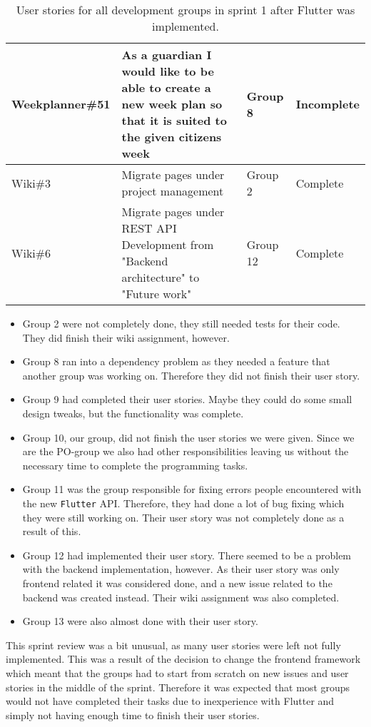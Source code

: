 \begin{table}[H]
\begin{tabular}{|p{2.8cm}|p{7cm}|p{1.6cm}|p{2cm}|}
    Weekplanner\#51 & As a guardian I would like to be able to create a new week plan so that it is suited to the given citizens week                                                          & Group 8         & Incomplete    \\ \hline
    Wiki\#3         & Migrate pages under project management                                                                                                                                   & Group 2         & Complete    \\ \hline
    Wiki\#6         & Migrate pages under REST API Development from "Backend architecture" to "Future work"                                                                                    & Group 12        & Complete    \\ \hline
    \end{tabular}
   \caption{User stories for all development groups in sprint 1 after Flutter was implemented.}\label{table:user-stories-sprint-1-review}
\end{table}

\begin{itemize}
    \item Group 2 were not completely done, they still needed tests for their code. They did finish their wiki assignment, however.
    \item Group 8 ran into a dependency problem as they needed a feature that another group was working on. Therefore they did not finish their user story.
    \item Group 9 had completed their user stories. Maybe they could do some small design tweaks, but the functionality was complete.
    \item Group 10, our group, did not finish the user stories we were given. Since we are the PO-group we also had other responsibilities leaving us without the necessary time to complete the programming tasks.
    \item Group 11 was the group responsible for fixing errors people encountered with the new \texttt{Flutter} API. Therefore, they had done a lot of bug fixing which they were still working on. Their user story was not completely done as a result of this.
    \item Group 12 had implemented their user story. There seemed to be a problem with the backend implementation, however. As their user story was only frontend related it was considered done, and a new issue related to the backend was created instead. Their wiki assignment was also completed.
    \item Group 13 were also almost done with their user story.
\end{itemize}
\noindent
This sprint review was a bit unusual, as many user stories were left not fully implemented. This was a result of the decision to change the frontend framework which meant that the groups had to start from scratch on new issues and user stories in the middle of the sprint.
Therefore it was expected that most groups would not have completed their tasks due to inexperience with Flutter and simply not having enough time to finish their user stories.

